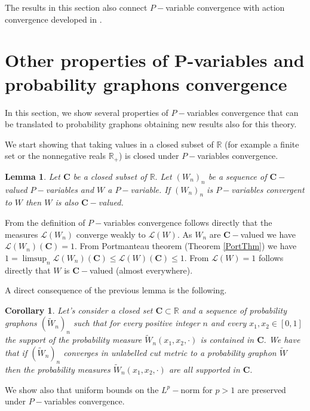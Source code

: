 \documentclass[11pt]{article}
\newtheorem{corollary}{Corollary}[theorem]
\newtheorem{lemma}[theorem]{Lemma}
\def\R{\mathbb{R}}
\begin{document}
The results in this section also connect $P-$variable convergence with action convergence developed in \cite{backhausz2018action}.   

\section{Other properties of P-variables and probability graphons convergence}\label{Sec7OtherProp}

In this section, we show several properties of $P-$variables convergence that can be translated to probability graphons obtaining new results also for this theory.

We start showing that taking values in a closed subset of $\R$ (for example a finite set or the nonnegative reals $\R_+$) is closed under $P-$variables convergence.

\begin{lemma}\label{LemmPsetsClosedSetsClosed}
Let $\mathbf{C}$ be a closed subset of $\R.$ Let $(W_n)_n$ be a sequence of $\mathbf{C}-$valued $P-$variables and $W$ a $P-$variable. If  $(W_n)_n$ is $P-$variables convergent to $W$ then $W$ is also $\mathbf{C}-$valued.
\end{lemma}
\proof
From the definition of $P-$variables convergence follows directly that the measures $\mathcal{L}(W_n)$ converge weakly to $\mathcal{L}(W).$ As $W_n$ are $\mathbf{C}-$valued we have $\mathcal{L}(W_n)(\mathbf{C})=1.$  From Portmanteau theorem (Theorem \ref{PortThm}) we have $1=\limsup_n\mathcal{L}(W_n)(\mathbf{C})\leq \mathcal{L}(W)(\mathbf{C})\leq 1.$ From $\mathcal{L}(W)= 1$ follows directly that $W$ is $\mathbf{C}-$valued (almost everywhere).
\endproof

A direct consequence of the previous lemma is the following.
\begin{corollary}
Let's consider a closed set $\mathbf{C}\subset \R$ and a sequence of probability graphons $(\widetilde W_n)_n$ such that for every positive integer $n$ and every $x_1,x_2\in [0,1]$ the support of the probability measure $\widetilde W_n(x_1,x_2,\cdot)$ is contained in $\mathbf{C}.$  We have that if $(\widetilde W_n)_n$ converges in unlabelled cut metric to a probability graphon $\widetilde W$ then the probability measures $\widetilde W_n(x_1,x_2,\cdot)$ are all supported in $\mathbf{C}.$
\end{corollary}

We show also that uniform bounds on the $L^p-$norm for $p>1$ are preserved under $P-$variables convergence.
\end{document}
